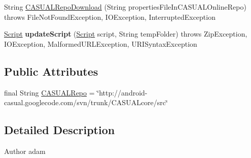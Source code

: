 \begin{DoxyCompactItemize}
\item 
String \hyperlink{classCASUAL_1_1network_1_1CASUALUpdates_ac425655d3ed96b358537d184c4cd1b1d}{C\-A\-S\-U\-A\-L\-Repo\-Download} (String properties\-File\-In\-C\-A\-S\-U\-A\-L\-Online\-Repo)  throws File\-Not\-Found\-Exception, I\-O\-Exception, Interrupted\-Exception 
\item 
\hypertarget{classCASUAL_1_1network_1_1CASUALUpdates_a75b4ba0d0a0852256d7af16b03c48505}{\hyperlink{classCASUAL_1_1caspac_1_1Script}{Script} {\bfseries update\-Script} (\hyperlink{classCASUAL_1_1caspac_1_1Script}{Script} script, String temp\-Folder)  throws Zip\-Exception, I\-O\-Exception, Malformed\-U\-R\-L\-Exception, U\-R\-I\-Syntax\-Exception }\label{classCASUAL_1_1network_1_1CASUALUpdates_a75b4ba0d0a0852256d7af16b03c48505}

\end{DoxyCompactItemize}
\subsection*{Public Attributes}
\begin{DoxyCompactItemize}
\item 
final String \hyperlink{classCASUAL_1_1network_1_1CASUALUpdates_af94f8633399fb6aaf79d1c0a23458b21}{C\-A\-S\-U\-A\-L\-Repo} = \char`\"{}http\-://android-\/casual.\-googlecode.\-com/svn/trunk/C\-A\-S\-U\-A\-Lcore/src\char`\"{}
\end{DoxyCompactItemize}


\subsection{Detailed Description}
\begin{DoxyAuthor}{Author}
adam 
\end{DoxyAuthor}


